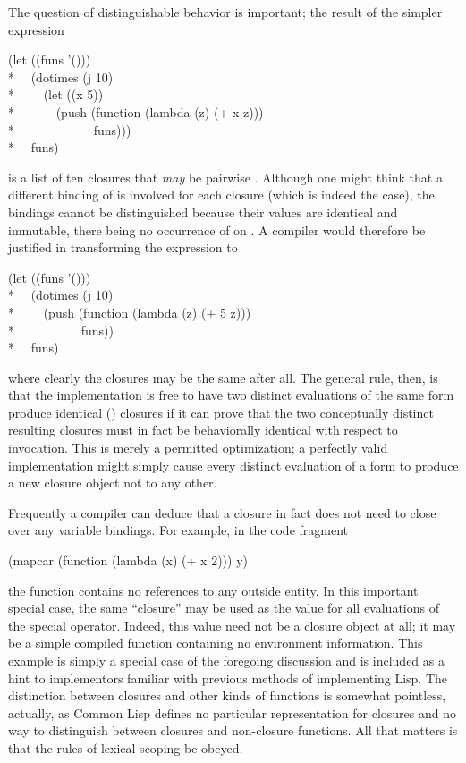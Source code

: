 \begin{defspec}
The question of distinguishable behavior is important; the result of
the simpler expression
\begin{lisp}
(let ((funs '())) \\*
~~(dotimes (j 10) \\*
~~~~(let ((x 5)) \\*
~~~~~~(push (function (lambda (z) (+ x z))) \\*
~~~~~~~~~~~~funs))) \\*
~~funs)
\end{lisp}
is a list of ten closures that \emph{may} be pairwise .  Although
one might think that a different binding of  is involved for
each closure (which is indeed the case), the bindings cannot be distinguished
because their values are identical and immutable, there being no occurrence
of  on .  A compiler would therefore be justified in
transforming the expression to
\begin{lisp}
(let ((funs '())) \\*
~~(dotimes (j 10) \\*
~~~~(push (function (lambda (z) (+ 5 z))) \\*
~~~~~~~~~~funs)) \\*
~~funs)
\end{lisp}
where clearly the closures may be the same after all.
The general rule, then, is that the implementation is free to
have two distinct evaluations of the same  form
produce identical () closures if it can prove that the
two conceptually distinct resulting closures must in fact be
behaviorally identical with respect to invocation.
This is merely a permitted optimization; a perfectly valid
implementation might simply cause every distinct evaluation of a 
form to produce a new closure object not  to any other.

Frequently a compiler can deduce that a closure in fact does not
need to close over any variable bindings.  For example,
in the code fragment
\begin{lisp}
(mapcar (function (lambda (x) (+ x 2))) y)
\end{lisp}
the function  contains no references to any outside
entity.  In this important special case, the same ``closure'' may be used
as the value for all evaluations of the  special operator.
Indeed, this value need not be a closure object at all; it may
be a simple compiled function containing no environment information.
This example is simply a special case of the foregoing discussion and
is included as a hint to implementors familiar with previous methods
of implementing Lisp.  The distinction between closures and other
kinds of functions is somewhat pointless, actually, as Common Lisp defines
no particular representation for closures and no way to distinguish
between closures and non-closure functions.  All that matters is that
the rules of lexical scoping be obeyed.


\end{defspec}
